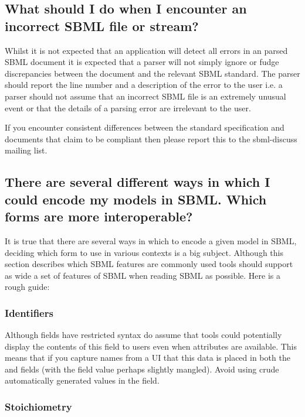 \documentclass{sbmlfaq}
\begin{document}
\subsection{What should I do when I encounter an incorrect SBML file or
  stream?} 

Whilst it is not expected that an application will detect all errors in an parsed SBML document it is
expected that a parser will not simply ignore or fudge discrepancies between the document and the relevant
SBML standard.  The parser should report the line number and a description of the error to the user
i.e. a parser should not assume that an incorrect SBML file is an extremely unusual event or that
the details of a parsing error are irrelevant to the user.

If you encounter consistent differences between the standard specification and documents that
claim to be compliant then please report this to the sbml-discuss mailing list. 

\subsection{There are several different ways in which I could encode my
  models in SBML. Which forms are more interoperable?}
\label{sec:bestpractice}
  
It is true that there are several ways in which to encode a given model in SBML, deciding which form to use in
various contexts is a big subject.  Although this section describes which SBML features are commonly used tools should
support as wide a set of features of SBML when reading SBML as possible.  Here is a rough guide:

\subsubsection{Identifiers}

Although  fields have restricted syntax do assume that tools could potentially display the contents
of this field to users even when  attributes are available.  This means that if you
capture names from a UI that this data is placed in both the  and  fields
(with the  field value perhaps slightly mangled).  Avoid using crude automatically generated values
in the  field.

\subsubsection{Stoichiometry}
\end{document}
